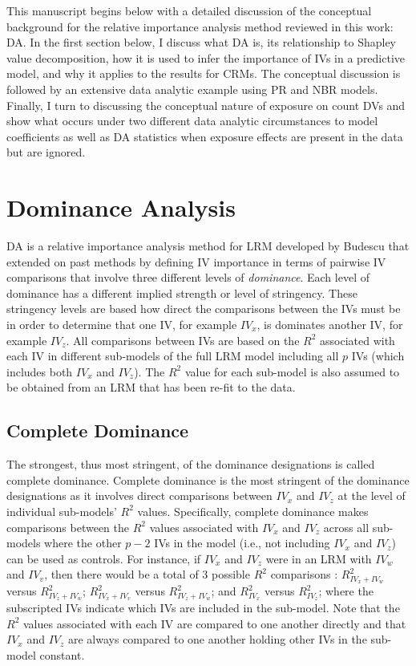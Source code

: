 \documentclass[ShortAfour,times,sageapa]{sagej}
\begin{document}
	This manuscript begins below with a detailed discussion of the conceptual background for the relative importance analysis method reviewed in this work: DA.
	In the first section below, I discuss what DA is, its relationship to Shapley value decomposition, how it is used to infer the importance of IVs in a predictive model, and why it applies to the results for CRMs.
	The conceptual discussion is followed by an extensive data analytic example using PR and NBR models.
	Finally, I turn to discussing the conceptual nature of exposure on count DVs and show what occurs under two different data analytic circumstances to model coefficients as well as DA statistics when exposure effects are present in the data but are ignored.
		
\section{Dominance Analysis}

	DA is a relative importance analysis method for LRM developed by Budescu \citeyear{budescu1993dominance} that extended on past methods by defining IV importance in terms of pairwise IV comparisons that involve three different levels of \emph{dominance}.
	Each level of dominance has a different implied strength or level of stringency. 
	These stringency levels are based how direct the comparisons between the IVs must be in order to determine that one IV, for example $IV_x$, is dominates another IV, for example $IV_z$.
	All comparisons between IVs are based on the $R^2$ associated with each IV in different sub-models of the full LRM model including all $p$ IVs (which includes both $IV_x$ and $IV_z$).
	The $R^2$ value for each sub-model is also assumed to be obtained from an LRM that has been re-fit to the data.
	
	\subsection{Complete Dominance}
	
	The strongest, thus most stringent, of the dominance designations is called complete dominance. 
	Complete dominance is the most stringent of the dominance designations as it involves direct comparisons between $IV_x$ and $IV_z$ at the level of individual sub-models' $R^2$ values.
	Specifically, complete dominance makes comparisons between the $R^2$ values associated with $IV_x$ and $IV_z$ across all sub-models where the other $p - 2$ IVs in the model (i.e., not including $IV_x$ and $IV_z$) can be used as controls.
	For instance, if $IV_x$ and $IV_z$ were in an LRM with $IV_w$ and $IV_v$, then there would be a total of 3 possible $R^2$ comparisons : $R^2_{IV_x + IV_w}$ versus $R^2_{IV_z + IV_w}$; $R^2_{IV_x + IV_v}$ versus $R^2_{IV_z + IV_w}$; and $R^2_{IV_x}$ versus $R^2_{IV_z}$; where the subscripted IVs indicate which IVs are included in the sub-model.
	Note that the $R^2$ values associated with each IV are compared to one another directly and that $IV_x$ and $IV_z$ are always compared to one another holding other IVs in the sub-model constant.
	
\end{document}
